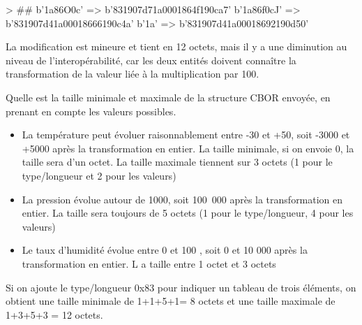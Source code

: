 

\begin{termc}[backgroundcolor=\color{palerod}, language=json, basicstyle=\tiny, escapechar=#]
> ##
b'\x1a\x86O\x0c' => b'831907d71a0001864f190ca7'
b'\x1a\x86f\x0cJ' => b'831907d41a00018666190c4a'
b'\x1a\rP' => b'831907d41a00018692190d50'
\end{termc}

La modification est mineure et tient en 12 octets, mais il y a une diminution au niveau de l'interopérabilité, car les deux entités doivent connaître la transformation de la valeur liée à la multiplication par 100.

{ Quelle est la taille minimale et maximale de la structure CBOR envoyée, en prenant en compte les valeurs possibles.
}
{
\begin{itemize}
    \item La température peut évoluer raisonnablement entre -30 et +50, soit -3000 et +5000 après la transformation en entier. La taille minimale, si on envoie 0, la taille sera d'un octet. La taille maximale tiennent sur 3 octets (1 pour le type/longueur et 2 pour les valeurs) 
    \item La pression évolue autour de 1000, soit 100~000 après la transformation en entier. La taille sera toujours de 5 octets (1 pour le type/longueur, 4 pour les valeurs)
    \item Le taux d'humidité évolue entre 0 et 100 , soit 0 et 10 000 après la transformation en entier. L a taille entre 1 octet et 3 octets
\end{itemize}

Si on ajoute le type/longueur 0x83 pour indiquer un tableau de trois éléments, on obtient une taille minimale de 1+1+5+1= 8 octets et une taille maximale de 1+3+5+3 = 12 octets.
}
